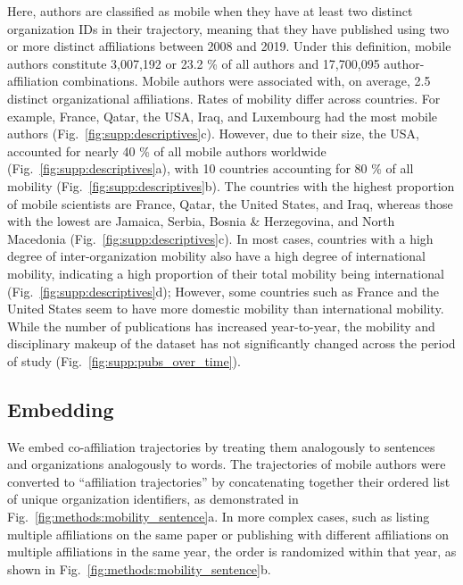 \documentclass[12pt]{article} %
\begin{document}
Here, authors are classified as mobile when they have at least two distinct organization IDs in their trajectory, meaning that they have published using two or more distinct affiliations between 2008 and 2019.
Under this definition, mobile authors constitute 3,007,192 or 23.2 \% of all authors and 17,700,095 author-affiliation combinations.
Mobile authors were associated with, on average, 2.5 distinct organizational affiliations.
Rates of mobility differ across countries.
For example, France, Qatar, the USA, Iraq, and Luxembourg had the most mobile authors (Fig.~\ref{fig:supp:descriptives}c).
However, due to their size, the USA, accounted for nearly 40 \% of all mobile authors worldwide (Fig.~\ref{fig:supp:descriptives}a), with 10 countries accounting for 80 \% of all mobility (Fig.~\ref{fig:supp:descriptives}b).
The countries with the highest proportion of mobile scientists are France, Qatar, the United States, and Iraq, whereas those with the lowest are Jamaica, Serbia, Bosnia \& Herzegovina, and North Macedonia (Fig.~\ref{fig:supp:descriptives}c).
In most cases, countries with a high degree of inter-organization mobility also have a high degree of international mobility, indicating a high proportion of their total mobility being international (Fig.~\ref{fig:supp:descriptives}d);
However, some countries such as France and the United States seem to have more domestic mobility than international mobility.
While the number of publications has increased year-to-year, the mobility and disciplinary makeup of the dataset has not significantly changed across the period of study (Fig.~\ref{fig:supp:pubs_over_time}).




\subsection*{Embedding}
We embed co-affiliation trajectories by treating them analogously to sentences and organizations analogously to words.
The trajectories of mobile authors were converted to ``affiliation trajectories'' by concatenating together their ordered list of unique organization identifiers, as demonstrated in Fig.~\ref{fig:methods:mobility_sentence}a.
In more complex cases, such as listing multiple affiliations on the same paper or publishing with different affiliations on multiple affiliations in the same year, the order is randomized within that year, as shown in  Fig.~\ref{fig:methods:mobility_sentence}b.
\end{document}
